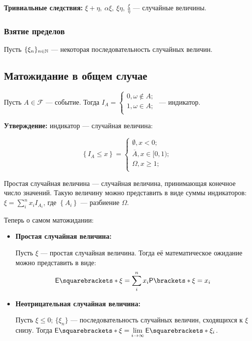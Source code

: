 \textbf{Тривиальные следствия:} $\xi + \eta,\ \alpha\xi,\ \xi\eta,\ \frac{\xi}{\eta}$ --- случайные
величины.

\subsubsection{Взятие пределов}

Пусть \(\{\xi_n\}_{n \in \mathbb{N}}\) --- некоторая последовательность случайных величин.


\subsection{Матожидание в общем случае}

\begin{definition}
    Пусть $A\in \mathcal{F}$ --- событие. Тогда $I_A = \begin{cases}
        0, \omega \not \in A;\\
        1, \omega \in A;\\
    \end{cases}$ --- индикатор.
\end{definition}

\textbf{Утверждение:} индикатор --- случайная величина:

\[
    \left\{ I_A \leq x \right\} = \begin{cases}
        \emptyset, x < 0;\\
        \overline{A}, x \in [0, 1);\\
        \Omega, x \geq 1;\\
    \end{cases}
\]

\begin{definition}
    Простая случайная величина --- случайная величина, принимающая конечное число значений. Такую величину
    можно представить в виде суммы индикаторов: $\xi = \sum\limits_{i}^{n}x_i I_{A_i}$, где $\left\{ A_i
    \right\}$ --- разбиение $\Omega$.
\end{definition}

Теперь о самом матожидании:

\begin{itemize}
    \item \textbf{Простая случайная величина:}

        Пусть $\xi$ --- простая случайная величина. Тогда её математическое ожидание можно представить в
        виде:
        \[
            \E{\xi} = \sum\limits_{i}^{n} x_i \Pr{\xi = x_i}
        \]

    \item \textbf{Неотрицательная случайная величина:}

        Пусть $\xi \leq 0$; $\{\xi_n\}$ --- последовательность случайных величин, сходящихся к $\xi$ снизу.
        Тогда $\E{\xi} = \lim\limits_{i \to \infty} \E{\xi_i}$.
\end{itemize}
